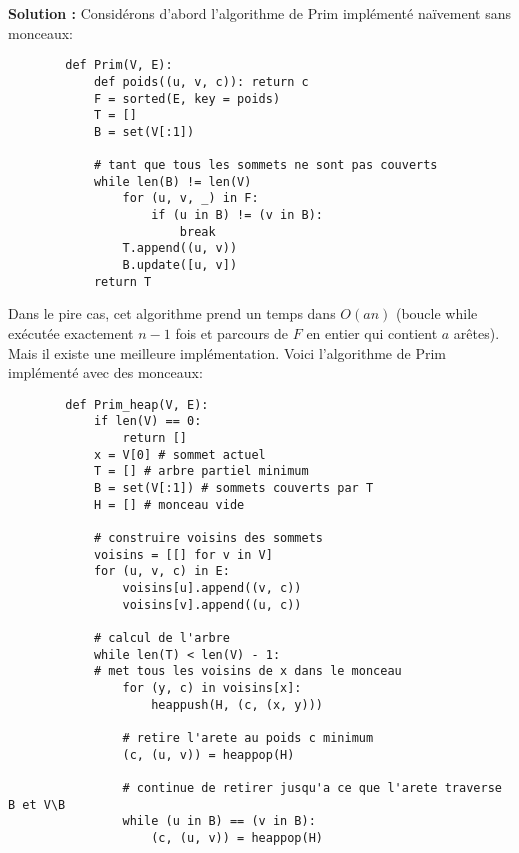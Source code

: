 \documentclass[11pt]{article} %
\newenvironment{solution}[1][\unskip]{%
	\par
	\noindent
	\textbf{Solution #1:}
	\noindent}
{\medskip}
\begin{document}
	\begin{solution}
		Considérons d'abord l'algorithme de Prim implémenté naïvement sans monceaux:
		\begin{lstlisting}
		def Prim(V, E):
			def poids((u, v, c)): return c
			F = sorted(E, key = poids)
			T = []
			B = set(V[:1])
		
			# tant que tous les sommets ne sont pas couverts
			while len(B) != len(V)
				for (u, v, _) in F:
					if (u in B) != (v in B):
						break
				T.append((u, v))
				B.update([u, v])
			return T
		\end{lstlisting}
		Dans le pire cas, cet algorithme prend un temps dans $O(an)$ (boucle while exécutée exactement $n-1$ fois et parcours de $F$ en entier qui contient $a$ arêtes). Mais il existe une meilleure implémentation.
		Voici l'algorithme de Prim implémenté avec des monceaux:
		\begin{lstlisting}
		def Prim_heap(V, E):
			if len(V) == 0:
				return []
			x = V[0] # sommet actuel
			T = [] # arbre partiel minimum
			B = set(V[:1]) # sommets couverts par T
			H = [] # monceau vide
		
			# construire voisins des sommets
			voisins = [[] for v in V]
			for (u, v, c) in E:
				voisins[u].append((v, c))
				voisins[v].append((u, c))
		
			# calcul de l'arbre
			while len(T) < len(V) - 1:
			# met tous les voisins de x dans le monceau
				for (y, c) in voisins[x]:
					heappush(H, (c, (x, y)))
		
				# retire l'arete au poids c minimum
				(c, (u, v)) = heappop(H)
		
				# continue de retirer jusqu'a ce que l'arete traverse B et V\B
				while (u in B) == (v in B):
					(c, (u, v)) = heappop(H)
				

\end{lstlisting}
\end{solution}
\end{document}
